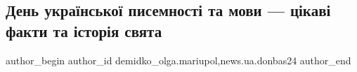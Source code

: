  
 
 
 
 
 
\subsection{День української писемності та мови — цікаві факти та історія свята}
\label{sec:09_11_2022.stz.news.ua.donbas24.2.den_ukr_pysemnosti_movy_fakty_istoria}
 
\ifcmt
 author_begin
   author_id demidko_olga.mariupol,news.ua.donbas24
 author_end
\fi
